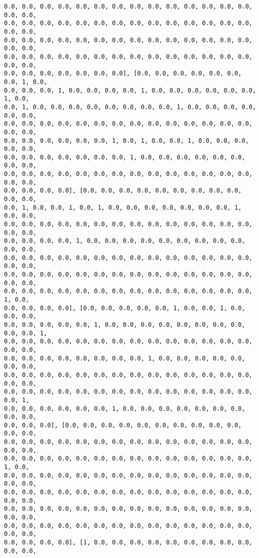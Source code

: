 \documentclass[11pt]{article}
\begin{document}
\begin{Verbatim}[commandchars=\\\{\}]
0.0, 0.0, 0.0, 0.0, 0.0, 0.0, 0.0, 0.0, 0.0, 0.0, 0.0, 0.0, 0.0, 0.0, 0.0, 0.0,
0.0, 0.0, 0.0, 0.0, 0.0, 0.0, 0.0, 0.0, 0.0, 0.0, 0.0, 0.0, 0.0, 0.0, 0.0, 0.0,
0.0, 0.0, 0.0, 0.0, 0.0, 0.0, 0.0, 0.0, 0.0, 0.0, 0.0, 0.0, 0.0, 0.0, 0.0, 0.0,
0.0, 0.0, 0.0, 0.0, 0.0, 0.0, 0.0, 0.0, 0.0, 0.0, 0.0, 0.0, 0.0, 0.0, 0.0, 0.0,
0.0, 0.0, 0.0, 0.0, 0.0, 0.0, 0.0], [0.0, 0.0, 0.0, 0.0, 0.0, 0.0, 0.0, 1, 0.0,
0.0, 0.0, 0.0, 1, 0.0, 0.0, 0.0, 0.0, 1, 0.0, 0.0, 0.0, 0.0, 0.0, 0.0, 1, 0.0,
0.0, 1, 0.0, 0.0, 0.0, 0.0, 0.0, 0.0, 0.0, 0.0, 1, 0.0, 0.0, 0.0, 0.0, 0.0, 0.0,
0.0, 0.0, 0.0, 0.0, 0.0, 0.0, 0.0, 0.0, 0.0, 0.0, 0.0, 0.0, 0.0, 0.0, 0.0, 0.0,
0.0, 0.0, 0.0, 0.0, 0.0, 0.0, 1, 0.0, 1, 0.0, 0.0, 1, 0.0, 0.0, 0.0, 0.0, 0.0,
0.0, 0.0, 0.0, 0.0, 0.0, 0.0, 0.0, 1, 0.0, 0.0, 0.0, 0.0, 0.0, 0.0, 0.0, 0.0,
0.0, 0.0, 0.0, 0.0, 0.0, 0.0, 0.0, 0.0, 0.0, 0.0, 0.0, 0.0, 0.0, 0.0, 0.0, 0.0,
0.0, 0.0, 0.0, 0.0], [0.0, 0.0, 0.0, 0.0, 0.0, 0.0, 0.0, 0.0, 0.0, 0.0, 0.0,
0.0, 1, 0.0, 0.0, 1, 0.0, 1, 0.0, 0.0, 0.0, 0.0, 0.0, 0.0, 0.0, 1, 0.0, 0.0,
0.0, 0.0, 0.0, 0.0, 0.0, 0.0, 0.0, 0.0, 0.0, 0.0, 0.0, 0.0, 0.0, 0.0, 0.0, 0.0,
0.0, 0.0, 0.0, 0.0, 1, 0.0, 0.0, 0.0, 0.0, 0.0, 0.0, 0.0, 0.0, 0.0, 0.0, 0.0,
0.0, 0.0, 0.0, 0.0, 0.0, 0.0, 0.0, 0.0, 0.0, 0.0, 0.0, 0.0, 0.0, 0.0, 0.0, 0.0,
0.0, 0.0, 0.0, 0.0, 0.0, 0.0, 0.0, 0.0, 0.0, 0.0, 0.0, 0.0, 0.0, 0.0, 0.0, 0.0,
0.0, 0.0, 0.0, 0.0, 0.0, 0.0, 0.0, 0.0, 0.0, 0.0, 0.0, 0.0, 0.0, 0.0, 1, 0.0,
0.0, 0.0, 0.0, 0.0], [0.0, 0.0, 0.0, 0.0, 0.0, 1, 0.0, 0.0, 1, 0.0, 0.0, 0.0,
0.0, 0.0, 0.0, 0.0, 0.0, 1, 0.0, 0.0, 0.0, 0.0, 0.0, 0.0, 0.0, 0.0, 0.0, 0.0, 1,
0.0, 0.0, 0.0, 0.0, 0.0, 0.0, 0.0, 0.0, 0.0, 0.0, 0.0, 0.0, 0.0, 0.0, 0.0, 0.0,
0.0, 0.0, 0.0, 0.0, 0.0, 0.0, 0.0, 0.0, 1, 0.0, 0.0, 0.0, 0.0, 0.0, 0.0, 0.0,
0.0, 0.0, 0.0, 0.0, 0.0, 0.0, 0.0, 0.0, 0.0, 0.0, 0.0, 0.0, 0.0, 0.0, 0.0, 0.0,
0.0, 0.0, 0.0, 0.0, 0.0, 0.0, 0.0, 0.0, 0.0, 0.0, 0.0, 0.0, 0.0, 0.0, 0.0, 1,
0.0, 0.0, 0.0, 0.0, 0.0, 0.0, 1, 0.0, 0.0, 0.0, 0.0, 0.0, 0.0, 0.0, 0.0, 0.0,
0.0, 0.0, 0.0], [0.0, 0.0, 0.0, 0.0, 0.0, 0.0, 0.0, 0.0, 0.0, 0.0, 0.0, 0.0,
0.0, 0.0, 0.0, 0.0, 0.0, 0.0, 0.0, 0.0, 0.0, 0.0, 0.0, 0.0, 0.0, 0.0, 0.0, 0.0,
0.0, 0.0, 0.0, 0.0, 0.0, 0.0, 0.0, 0.0, 0.0, 0.0, 0.0, 0.0, 0.0, 0.0, 1, 0.0,
0.0, 0.0, 0.0, 0.0, 0.0, 0.0, 0.0, 0.0, 0.0, 0.0, 0.0, 0.0, 0.0, 0.0, 0.0, 0.0,
0.0, 0.0, 0.0, 0.0, 0.0, 0.0, 0.0, 0.0, 0.0, 0.0, 0.0, 0.0, 0.0, 0.0, 0.0, 0.0,
0.0, 0.0, 0.0, 0.0, 0.0, 0.0, 0.0, 0.0, 0.0, 0.0, 0.0, 0.0, 0.0, 0.0, 0.0, 0.0,
0.0, 0.0, 0.0, 0.0, 0.0, 0.0, 0.0, 0.0, 0.0, 0.0, 0.0, 0.0, 0.0, 0.0, 0.0, 0.0,
0.0, 0.0, 0.0, 0.0], [1, 0.0, 0.0, 0.0, 0.0, 0.0, 0.0, 0.0, 0.0, 0.0, 0.0, 0.0,

\end{Verbatim}
\end{document}

